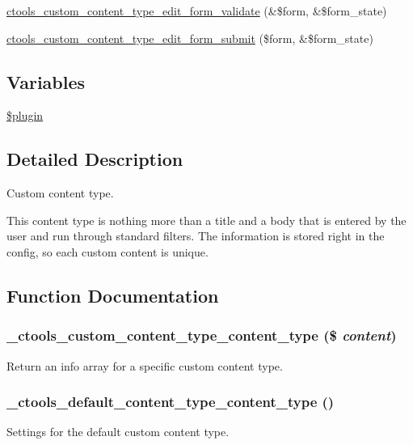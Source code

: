 \begin{DoxyCompactItemize}
\item 
\hyperlink{custom_8inc_a3f4656be834b0b67b500cd4336a5c54a}{ctools\_\-custom\_\-content\_\-type\_\-edit\_\-form\_\-validate} (\&\$form, \&\$form\_\-state)
\item 
\hyperlink{custom_8inc_ad0a83093c506bb38b3acd0175ba46e51}{ctools\_\-custom\_\-content\_\-type\_\-edit\_\-form\_\-submit} (\$form, \&\$form\_\-state)
\end{DoxyCompactItemize}
\subsection*{Variables}
\begin{DoxyCompactItemize}
\item 
\hyperlink{custom_8inc_ada8a7130088351710bb02ed622d6bf65}{\$plugin}
\end{DoxyCompactItemize}


\subsection{Detailed Description}
Custom content type.

This content type is nothing more than a title and a body that is entered by the user and run through standard filters. The information is stored right in the config, so each custom content is unique. 

\subsection{Function Documentation}
\hypertarget{custom_8inc_a7ff302d633e91a61dde504e1f3a65882}{
\subsubsection[{\_\-ctools\_\-custom\_\-content\_\-type\_\-content\_\-type}]{\setlength{\rightskip}{0pt plus 5cm}\_\-ctools\_\-custom\_\-content\_\-type\_\-content\_\-type (\$ {\em content})}}
\label{custom_8inc_a7ff302d633e91a61dde504e1f3a65882}
Return an info array for a specific custom content type. \hypertarget{custom_8inc_a8f3961a55c9aa29f6da0ac7febfc6451}{
\subsubsection[{\_\-ctools\_\-default\_\-content\_\-type\_\-content\_\-type}]{\setlength{\rightskip}{0pt plus 5cm}\_\-ctools\_\-default\_\-content\_\-type\_\-content\_\-type ()}}
\label{custom_8inc_a8f3961a55c9aa29f6da0ac7febfc6451}
Settings for the default custom content type.

